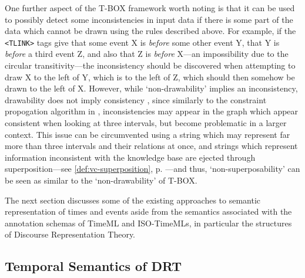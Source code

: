 \documentclass[a4paper,12pt,leqno]{article}
\newcommand{\nb}[1]{{\color{red}[NB\footnote{{\color{red}#1}}]}}
\begin{document}
One further aspect of the T-BOX framework worth noting is that it can be used to possibly detect some inconsistencies in input data if there is some part of the data which cannot be drawn using the rules described above. For example, if the \verb|<TLINK>| tags give that some event X is \textit{before} some other event Y, that Y is \textit{before} a third event Z, and also that Z is \textit{before} X---an impossibility due to the circular transitivity---the inconsistency should be discovered when attempting to draw X to the left of Y, which is to the left of Z, which should then somehow be drawn to the left of X. However, while `non-drawability' implies an inconsistency, drawability does not imply consistency \citep[p. 12]{verhagen2005TBOX}, since similarly to the constraint propogation algorithm in \citet{allen1983maintaining}, inconsistencies may appear in the graph which appear consistent when looking at three intervals, but become problematic in a larger context. This issue can be circumvented using a string which may represent far more than three intervals and their relations at once, and strings which represent information inconsistent with the knowledge base are ejected through superposition---see \cref{def:vc-superposition}, p. \pageref{def:vc-superposition}---and thus, `non-superposability' can be seen as similar to the `non-drawability' of T-BOX.

The next section discusses some of the existing approaches to semantic representation of times and events aside from the semantics associated with the annotation schemas of TimeML and ISO-TimeMLs, in particular the structures of Discourse Representation Theory.

\subsection{Temporal Semantics of DRT}\label{sub:semantics}
\end{document}
